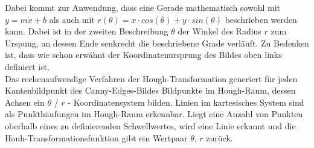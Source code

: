 Dabei kommt zur Anwendung, dass eine Gerade mathematisch sowohl mit $y
= m \dot x + b$ als auch mit $r(\theta) = x \cdot cos(\theta) + y \cdot
sin(\theta)$ beschrieben werden kann. Dabei ist in der zweiten Beschreibung 
$\theta$ der  Winkel des Radius $r$ zum Urspung, an dessen Ende senkrecht die
beschriebene Grade verläuft. Zu Bedenken ist, dass wie schon erwähnt der
Koordinatenursprung des Bildes oben links definiert ist.\\
Das rechenaufwendige Verfahren der Hough-Transformation generiert für jeden
Kantenbildpunkt des Canny-Edges-Bildes Bildpunkte im Hough-Raum, dessen Achsen
ein $\theta$ / $r$ - Koordinatensystem bilden. Linien im kartesisches System
sind als Punkthäufungen im Hough-Raum erkennbar. Liegt eine Anzahl von
Punkten oberhalb eines zu definierenden Schwellwertes, wird eine Linie erkannt
und die Houh-Transformationsfunktion gibt ein Wertpaar $\theta$, $r$ zurück.
